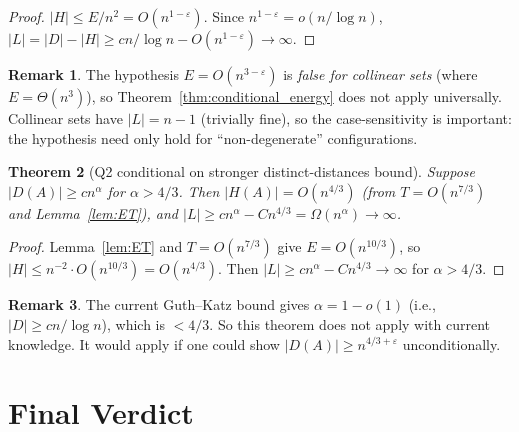 \documentclass[12pt,a4paper]{amsart}
\def\cL{\textit{L}}\def\cH{\textit{H}}%
\theoremstyle{plain}
\newtheorem{theorem}{Theorem}[section]
\theoremstyle{definition}
\newtheorem{remark}[theorem]{Remark}
\newcommand{\cL}{\mathcal{L}}
\newcommand{\cH}{\mathcal{H}}
\begin{document}
\begin{proof}
$|\cH|\le E/n^2=O(n^{1-\varepsilon})$.  Since $n^{1-\varepsilon}=o(n/\log n)$,
$|\cL|=|D|-|\cH|\ge cn/\log n - O(n^{1-\varepsilon})\to\infty$.
\end{proof}

\begin{remark}
The hypothesis $E=O(n^{3-\varepsilon})$ is \emph{false for collinear sets}
(where $E=\Theta(n^3)$), so Theorem~\ref{thm:conditional_energy} does
not apply universally.  Collinear sets have $|\cL|=n-1$ (trivially fine),
so the case-sensitivity is important: the hypothesis need only hold for
``non-degenerate'' configurations.
\end{remark}

\begin{theorem}[Q2 conditional on stronger distinct-distances bound]
\label{thm:conditional_DD}
Suppose $|D(A)|\ge cn^\alpha$ for $\alpha>4/3$.
Then $|\cH(A)|=O(n^{4/3})$ (from $T=O(n^{7/3})$ and Lemma~\ref{lem:ET}),
and $|\cL|\ge cn^\alpha - Cn^{4/3}=\Omega(n^\alpha)\to\infty$.
\end{theorem}

\begin{proof}
Lemma~\ref{lem:ET} and $T=O(n^{7/3})$ give $E=O(n^{10/3})$,
so $|\cH|\le n^{-2}\cdot O(n^{10/3})=O(n^{4/3})$.
Then $|\cL|\ge cn^\alpha-Cn^{4/3}\to\infty$ for $\alpha>4/3$.
\end{proof}

\begin{remark}
The current Guth--Katz bound gives $\alpha=1-o(1)$ (i.e., $|D|\ge cn/\log n$),
which is $< 4/3$.  So this theorem does not apply with current knowledge.
It would apply if one could show $|D(A)|\ge n^{4/3+\varepsilon}$ unconditionally.
\end{remark}

\section{Final Verdict}
\label{sec:verdict}
\end{document}
